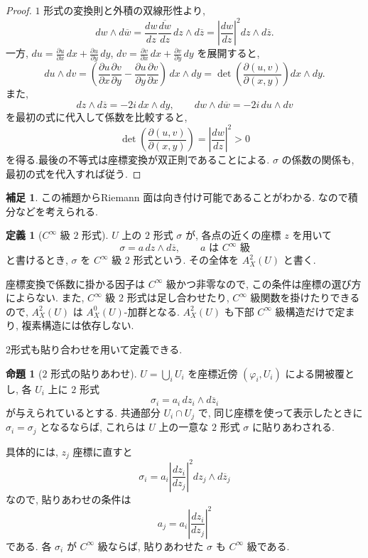 \documentclass[dvipdfmx,a4paper,11pt]{article} %
\theoremstyle{definition}
\numberwithin{equation}{section}
\newtheorem{prop}[thm]{命題}
\newtheorem{dfn}[thm]{定義}
\newtheorem{rem}[thm]{補足}
\begin{document}
\begin{proof}
$1$ 形式の変換則と外積の双線形性より, 
\[
dw\wedge d\overline w
=\frac{dw}{dz}\overline{\frac{dw}{dz}}\,
 dz\wedge d\overline z
=\left|\frac{dw}{dz}\right|^2 dz\wedge d\overline z.
\]
一方, $du=\frac{\partial u}{\partial x}\,dx+\frac{\partial u}{\partial y}\,dy$, $dv=\frac{\partial v}{\partial x}\,dx+\frac{\partial v}{\partial y}\,dy$ を展開すると, 
\[
du\wedge dv=(\frac{\partial u}{\partial x}\frac{\partial v}{\partial y}-\frac{\partial u}{\partial y}\frac{\partial v}{\partial x})\,dx\wedge dy
=\det\left(\frac{\partial(u,v)}{\partial(x,y)}\right)dx\wedge dy.
\]
また, 
\[
dz\wedge d\overline z=-2i\,dx\wedge dy,\qquad
dw\wedge d\overline w=-2i\,du\wedge dv
\]
を最初の式に代入して係数を比較すると, 
\[
\det\left(\frac{\partial(u,v)}{\partial(x,y)}\right)
=\left|\frac{dw}{dz}\right|^2>0
\]
を得る.最後の不等式は座標変換が双正則であることによる.
$\sigma$ の係数の関係も, 最初の式を代入すれば従う.
\end{proof}
\begin{rem}
この補題からRiemann 面は向き付け可能であることがわかる. なので積分などを考えられる. 
\end{rem}


\begin{dfn}[$C^\infty$ 級 $2$ 形式]\label{O-M100}
$U$ 上の $2$ 形式 $\sigma$ が, 各点の近くの座標 $z$ を用いて
\[
\sigma=a\,dz\wedge d\overline z,\qquad a\text{ は }C^\infty\text{ 級}
\]
と書けるとき, $\sigma$ を $C^\infty$ 級 $2$ 形式という.
その全体を $A_X^2(U)$ と書く.
\end{dfn}

座標変換で係数に掛かる因子は $C^\infty$ 級かつ非零なので, 
この条件は座標の選び方によらない.
また, $C^\infty$ 級 $2$ 形式は足し合わせたり, 
$C^\infty$ 級関数を掛けたりできるので, 
$A_X^2(U)$ は $A_X^0(U)$-加群となる.
$A_X^2(U)$ も下部 $C^\infty$ 級構造だけで定まり, 
複素構造には依存しない.

2形式も貼り合わせを用いて定義できる. 
\begin{prop}[$2$ 形式の貼りあわせ]
$U=\bigcup_i U_i$ を座標近傍 $(\varphi_i,U_i)$ による開被覆とし, 
各 $U_i$ 上に $2$ 形式
\[
\sigma_i=a_i\,dz_i\wedge d\overline z_i
\]
が与えられているとする.
共通部分 $U_i\cap U_j$ で, 同じ座標を使って表示したときに
$\sigma_i=\sigma_j$ となるならば, 
これらは $U$ 上の一意な $2$ 形式 $\sigma$ に貼りあわされる.

具体的には, $z_j$ 座標に直すと
\[
\sigma_i
=a_i\left|\frac{dz_i}{dz_j}\right|^2
 dz_j\wedge d\overline z_j
\]
なので, 貼りあわせの条件は
\[
a_j=a_i\left|\frac{dz_i}{dz_j}\right|^2
\]
である.
各 $\sigma_i$ が $C^\infty$ 級ならば, 
貼りあわせた $\sigma$ も $C^\infty$ 級である.
\end{prop}
\end{document}
